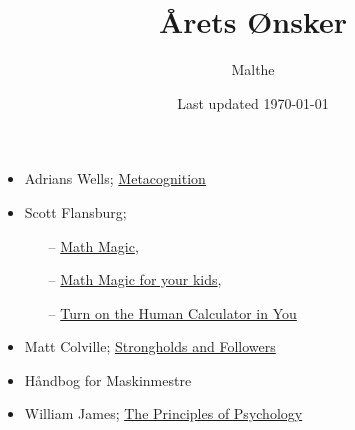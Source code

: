 \documentclass{article}
\title{Årets Ønsker}
\author{Malthe}
\date{Last updated \today}
\begin{document}
\maketitle


\begin{itemize}
\subsection{Bøger}
    \item  Adrians Wells; \href{https://www.saxo.com/dk/metacognitive-therapy_peter-fisher_paperback_9780415434997}{Metacognition}
    \
    \item  Scott Flansburg;
        \begin{itemize}
            \item[--] \href{https://www.saxo.com/dk/math-magic-revised-edition_scott-flansburg-victoria-hay_paperback_9780060726355}{Math Magic},
            \item[--] \href{https://www.saxo.com/dk/math-magic-for-your-kids_scott-flansburg_paperback_9780060977313}{Math Magic for your kids},
            \item[--] \href{https://www.saxo.com/dk/turn-on-the-human-calculator-in-you_scott-flansburg_paperback_9780988408425}{Turn on the Human Calculator in You}
        \end{itemize}
    \item Matt Colville; \href{https://strongholds-and-streaming.backerkit.com/hosted_preorders/126471}{Strongholds and Followers}
    \item Håndbog for Maskinmestre
    \item William James; \href{https://www.saxo.com/dk/the-principles-of-psychology_william-james_paperback_9781515011767}{The Principles of Psychology}

\end{itemize}
\end{document}
